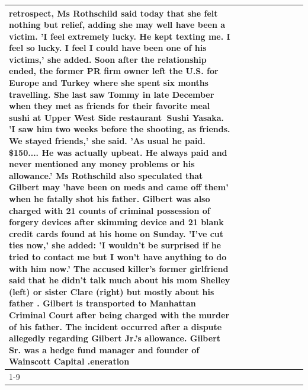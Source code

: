 \begin{table}[H]
\begin{tabular}{lllrlllll}
retrospect, Ms Rothschild said today that she felt nothing but relief, adding she may well have been a victim. 'I feel extremely lucky. He kept texting me. I feel so lucky. I feel I could have been one of his victims,' she added. Soon after the relationship ended, the former PR firm owner left the U.S. for Europe and Turkey where she spent six months  travelling. She last saw Tommy in late December when they met as friends for their favorite meal sushi at Upper West Side restaurant Sushi Yasaka. 'I saw him two weeks before the shooting, as friends. We stayed friends,' she said. 'As usual he paid. \$150.... He was actually upbeat. He always paid and never mentioned any money problems or his allowance.' Ms Rothschild also speculated that Gilbert may 'have been on meds and came off them' when he fatally shot his father. Gilbert was also charged with 21 counts of criminal possession of forgery devices after skimming device and 21 blank credit cards found at his home on Sunday. 'I've cut ties now,' she added: 'I wouldn’t be surprised if he tried to contact me but I won’t have anything to do with him now.' The accused killer's former girlfriend said that he didn't talk much about his mom Shelley (left) or sister Clare (right) but mostly about his father . Gilbert is transported to Manhattan Criminal Court  after being charged with the murder of his father. The incident occurred after a dispute allegedly regarding Gilbert Jr.'s allowance. Gilbert Sr. was a hedge fund manager and founder of Wainscott Capital .eneration \\
\cline{1-9} \cline{2-9}

\end{tabular}
\end{table}
